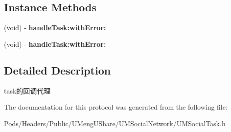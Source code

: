 \subsection*{Instance Methods}
\begin{DoxyCompactItemize}
\item 
\mbox{\label{protocol_u_m_social_task_delegate_01-p_a49e425d55076e59db5c169abbda735c1}} 
(void) -\/ {\bfseries handle\+Task\+:with\+Error\+:}
\item 
\mbox{\label{protocol_u_m_social_task_delegate_01-p_a49e425d55076e59db5c169abbda735c1}} 
(void) -\/ {\bfseries handle\+Task\+:with\+Error\+:}
\end{DoxyCompactItemize}


\subsection{Detailed Description}
task的回调代理 

The documentation for this protocol was generated from the following file\+:\begin{DoxyCompactItemize}
\item 
Pods/\+Headers/\+Public/\+U\+Meng\+U\+Share/\+U\+M\+Social\+Network/U\+M\+Social\+Task.\+h\end{DoxyCompactItemize}
